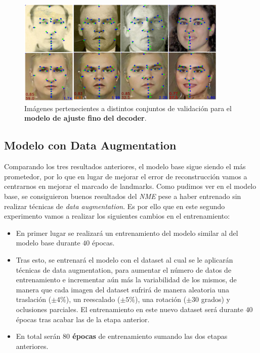         \begin{figure}[!h]
            \centering
            \includegraphics[width=0.9\textwidth]{img/image_decoder.png}
            \caption{Imágenes pertenecientes a distintos conjuntos de validación para el \textbf{modelo de ajuste fino del decoder}.}
            \label{fig:Ejemplo_decoder}
        \end{figure}

    \subsection{Modelo con Data Augmentation}
        \noindent Comparando los tres resultados anteriores, el modelo base sigue siendo el más prometedor, por lo que en lugar de mejorar el error de reconstrucción vamos a centrarnos en mejorar el marcado de landmarks. Como pudimos ver en el modelo base, se consiguieron buenos resultados del \textit{NME} pese a haber entrenado sin realizar técnicas de \textit{data augmentation}. Es por ello que en este segundo experimento vamos a realizar los siguientes cambios en el entrenamiento: 
        
        \begin{itemize}
            \item En primer lugar se realizará un entrenamiento del modelo similar al del modelo base durante $40$ épocas.
            \item Tras esto, se entrenará el modelo con el dataset al cual se le aplicarán técnicas de data augmentation, para aumentar el número de datos de entrenamiento e incrementar aún más la variabilidad de los mismos, de manera que cada imagen del dataset sufrirá de manera aleatoria una traslación ($\pm 4\%$), un reescalado ($\pm 5\%$), una rotación ($\pm 30$ grados) y oclusiones parciales. El entrenamiento en este nuevo dataset será durante $40$ épocas tras acabar las de la etapa anterior.
            \item En total serán \textbf{$80$ épocas} de entrenamiento sumando las dos etapas anteriores.
        \end{itemize}

